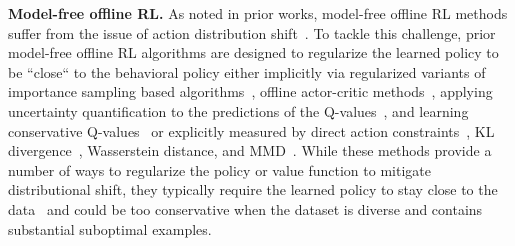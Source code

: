 \textbf{Model-free offline RL.} As noted in prior works, model-free offline RL methods suffer from the issue of action distribution shift~\citep{kumar2019stabilizing, levine2020offline}.
To tackle this challenge, prior model-free offline RL algorithms are designed to regularize the learned policy to be ``close`` to the behavioral policy either implicitly via regularized variants of importance sampling based algorithms~\citep{precup2001off, sutton2016emphatic, LiuSAB19, SwaminathanJ15, nachum2019algaedice}, offline actor-critic methods~\citep{siegel2020keep, peng2019advantage}, applying uncertainty quantification to the predictions of the Q-values~\citep{agarwal2020optimistic, kumar2019stabilizing, wu2019behavior, levine2020offline}, and learning conservative Q-values~\citep{kumar2020conservative} or explicitly measured by direct action constraints~\cite{fujimoto2018off},
KL divergence~\citep{jaques2019way,wu2019behavior, zhou2020plas}, Wasserstein distance, and MMD~\citep{kumar2019stabilizing}. 
While these methods provide a number of ways to regularize the policy or value function to mitigate distributional shift, they typically require the learned policy to stay close to the data~\citep{levine2020offline} and could be too conservative when the dataset is diverse and contains substantial suboptimal examples.
